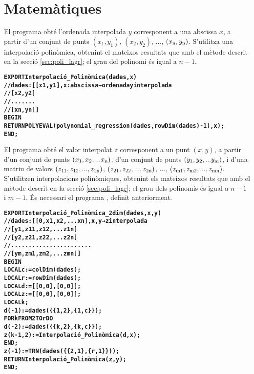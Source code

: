 \section{Matemàtiques}

El programa  obté l'ordenada interpolada $y$ corresponent a una abscissa $x$, a partir d'un conjunt  de punts $(x_1,y_1)$, $(x_2,y_2)$, ..., $(x_\mathrm{n},y_\mathrm{n})$. S'utilitza una interpolació polinòmica, obtenint el mateixos resultats que amb el mètode descrit en la secció \vref{sec:poli_lagr}; el grau del polinomi és igual a $n-1$.
\vspace{-1cm}
\begin{alltt}
\bfseries
{}
    EXPORT Interpolació_Polinòmica(dades,x)
    // dades:[[x1,y1], x:abscissa → ordenada y interpolada
    //        [x2,y2]
    //        .......
    //        [xn,yn]]
    BEGIN
      RETURN POLYEVAL(polynomial_regression(dades,rowDim(dades)-1),x);
    END;
\end{alltt}


El programa  obté el valor interpolat $z$ corresponent a un punt $(x, y)$, a partir d'un conjunt de punts $(x_\mathrm{1}, x_\mathrm{2}, ... x_\mathrm{n})$, d'un conjunt de punts $(y_\mathrm{1}, y_\mathrm{2}, ... y_\mathrm{m})$, i d'una matriu de valors $(z_\mathrm{11}, z_\mathrm{12}, ..., z_\mathrm{1n})$,
$(z_\mathrm{21}, z_\mathrm{22}, ..., z_\mathrm{2n})$, ..., $(z_\mathrm{m1}, z_\mathrm{m2}, ..., z_\mathrm{mn})$. S'utilitzen  interpolacions polinòmiques, obtenint els mateixos resultats que amb el mètode descrit en la secció \vref{sec:poli_lagr}; el grau dels polinomis és igual a $n-1$ i $m-1$.
És necessari el programa , definit anteriorment.
\vspace{-1cm}
\begin{alltt}
\bfseries
{}
    EXPORT Interpolació_Polinòmica_2dim(dades,x,y)
    // dades:[[0,   x1,  x2, ...  xn], x, y → z interpolada
    //        [y1, z11, z12, ... z1n]
    //        [y2, z21, z22, ... z2n]
    //        .......................
    //        [ym, zm1, zm2, ... zmn]]
    BEGIN
      LOCAL c:=colDim(dades);
      LOCAL r:=rowDim(dades);
      LOCAL d:=[[0,0],[0,0]];
      LOCAL z:=[[0,0],[0,0]];
      LOCAL k;
      d(-1):=dades(\{\{1,2\},\{1,c\}\});
      FOR k FROM 2 TO r DO
        d(-2):=dades(\{\{k,2\},\{k,c\}\});
        z(k-1,2):=Interpolació_Polinòmica(d,x);
      END;
      z(-1):=TRN(dades(\{\{2,1\},\{r,1\}\}));
      RETURN Interpolació_Polinòmica(z,y);
    END;
\end{alltt}

